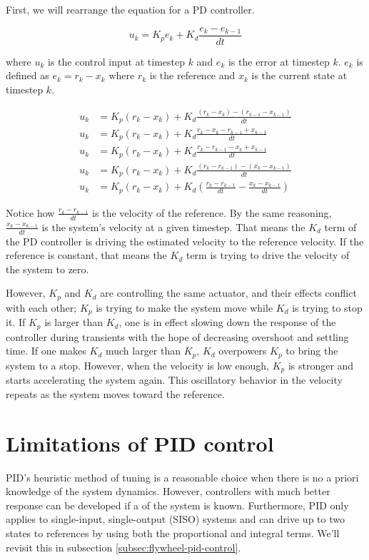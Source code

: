 First, we will rearrange the equation for a PD controller.

\begin{equation*}
  u_k = K_p e_k + K_d \frac{e_k - e_{k-1}}{dt}
\end{equation*}

where $u_k$ is the \gls{control input} at timestep $k$ and $e_k$ is the
\gls{error} at timestep $k$. $e_k$ is defined as $e_k = r_k - x_k$ where $r_k$
is the \gls{reference} and $x_k$ is the current \gls{state} at timestep $k$.

\begin{align*}
  u_k &= K_p (r_k - x_k) + K_d \frac{(r_k - x_k) - (r_{k-1} - x_{k-1})}{dt} \\
  u_k &= K_p (r_k - x_k) + K_d \frac{r_k - x_k - r_{k-1} + x_{k-1}}{dt} \\
  u_k &= K_p (r_k - x_k) + K_d \frac{r_k - r_{k-1} - x_k + x_{k-1}}{dt} \\
  u_k &= K_p (r_k - x_k) + K_d \frac{(r_k - r_{k-1}) - (x_k - x_{k-1})}{dt} \\
  u_k &= K_p (r_k - x_k) + K_d \left(\frac{r_k - r_{k-1}}{dt} -
    \frac{x_k - x_{k-1}}{dt}\right)
\end{align*}

Notice how $\frac{r_k - r_{k-1}}{dt}$ is the velocity of the \gls{reference}. By
the same reasoning, $\frac{x_k - x_{k-1}}{dt}$ is the \gls{system}'s velocity at
a given timestep. That means the $K_d$ term of the PD controller is driving the
estimated velocity to the \gls{reference} velocity. If the \gls{reference} is
constant, that means the $K_d$ term is trying to drive the velocity of the
\gls{system} to zero.

However, $K_p$ and $K_d$ are controlling the same actuator, and their effects
conflict with each other; $K_p$ is trying to make the \gls{system} move while
$K_d$ is trying to stop it. If $K_p$ is larger than $K_d$, one is in effect
slowing down the response of the controller during transients with the hope of
decreasing \gls{overshoot} and \gls{settling time}. If one makes $K_d$ much
larger than $K_p$, $K_d$ overpowers $K_p$ to bring the \gls{system} to a stop.
However, when the velocity is low enough, $K_p$ is stronger and starts
accelerating the \gls{system} again. This oscillatory behavior in the velocity
repeats as the \gls{system} moves toward the \gls{reference}.

\section{Limitations of PID control}

PID's heuristic method of tuning is a reasonable choice when there is no a
priori knowledge of the \gls{system} dynamics. However, controllers with much
better response can be developed if a  of the
\gls{system} is known. Furthermore, PID only applies to single-input,
single-output (SISO) \glspl{system} and can drive up to two \glspl{state} to
\glspl{reference} by using both the proportional and integral terms. We'll
revisit this in subsection \ref{subsec:flywheel-pid-control}.
